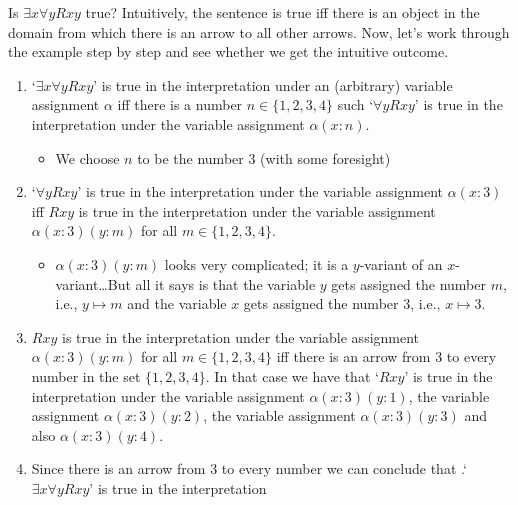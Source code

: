  Is $\exists x\forall y Rxy$ true? Intuitively, the sentence is true iff there is an object in the domain from which there is an arrow to all other arrows. Now, let's work through the example step by step and see whether we get the intuitive outcome.
 \begin{enumerate}
 \item  `$\exists x\forall y Rxy$' is true in the interpretation under an (arbitrary) variable assignment $\alpha$ iff there is a number $n\in\{1,2,3,4\}$ such `$\forall y Rxy$' is true in the interpretation under the variable assignment $\alpha(x:n)$. 
 \begin{itemize}
 \item We choose $n$ to be the number 3 (with some foresight)
 \end{itemize}
 \item `$\forall y Rxy$' is true in the interpretation under the variable assignment $\alpha(x:3)$ iff $Rxy$ is true in the interpretation under the variable assignment $\alpha(x:3)(y:m)$ for all $m\in\{1,2,3,4\}$.
 \begin{itemize}
 \item $\alpha(x:3)(y:m)$ looks very complicated; it is a $y$-variant of an $x$-variant\ldots But all it says is that the variable $y$ gets assigned the number $m$, i.e., $y\mapsto m$ and the variable $x$ gets assigned the number $3$, i.e., $x\mapsto 3$.
 \end{itemize}
 \item $Rxy$ is true in the interpretation under the variable assignment $\alpha(x:3)(y:m)$ for all $m\in\{1,2,3,4\}$ iff there is an arrow from $3$ to every number in the set $\{1,2,3,4\}$. In that case we have that `$Rxy$' is true in the interpretation under the variable assignment $\alpha(x:3)(y:1)$, the variable assignment $\alpha(x:3)(y:2)$, the variable assignment $\alpha(x:3)(y:3)$ and also $\alpha(x:3)(y:4)$.
 \item Since there is an arrow from 3 to every number we can conclude that .`$\exists x\forall y Rxy$' is true in the interpretation
 \end{enumerate}
 
